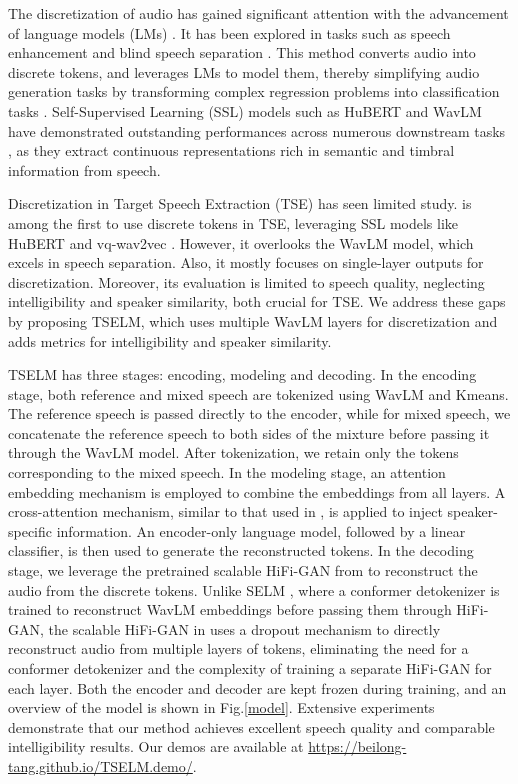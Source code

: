 \documentclass[conference]{IEEEtran}
\begin{document}
The discretization of audio has gained significant attention with the advancement of language models (LMs) \cite{l1, l2, l3, l4, l5}. It has been explored in
tasks such as speech enhancement \cite{selm} and blind speech separation \cite{dasb,tokensplit}.
This method converts audio into discrete tokens, and leverages LMs to model them, thereby simplifying audio generation tasks by transforming complex regression problems into classification tasks \cite{dasb}. Self-Supervised Learning (SSL) models such as HuBERT \cite{hubert} and WavLM \cite{wavlm} have demonstrated outstanding performances across numerous downstream tasks \cite{superb}, as they extract continuous representations rich in semantic and timbral information from speech.

Discretization in Target Speech Extraction (TSE) has seen limited study. \cite{gen_tse} is among the first to use discrete tokens in TSE, leveraging SSL models like HuBERT and vq-wav2vec \cite{vq_wav2vec}. However, it overlooks the WavLM model, which excels in speech separation. Also, it mostly focuses on single-layer outputs for discretization. Moreover, its evaluation is limited to speech quality, neglecting intelligibility and speaker similarity, both crucial for TSE. We address these gaps by proposing TSELM, which uses multiple WavLM layers for discretization and adds metrics for intelligibility and speaker similarity.

TSELM has three stages: encoding, modeling and decoding. In the encoding stage, both reference and mixed speech are tokenized using WavLM and Kmeans. The reference speech is passed directly to the encoder, while for mixed speech, we concatenate the reference speech to both sides of the mixture before passing it through the WavLM model. After tokenization, we retain only the tokens corresponding to the mixed speech.
In the modeling stage, an attention embedding mechanism is employed to combine the embeddings from all layers. A cross-attention mechanism, similar to that used in \cite{usef_tes}, is applied to inject speaker-specific information. An encoder-only language model, followed by a linear classifier, is then used to generate the reconstructed tokens.
In the decoding stage, we leverage the pretrained scalable HiFi-GAN from \cite{unit_hifi} to reconstruct the audio from the discrete tokens. Unlike SELM \cite{selm}, where a conformer detokenizer is trained to reconstruct WavLM embeddings before passing them through HiFi-GAN, the scalable HiFi-GAN in \cite{unit_hifi} uses a dropout mechanism to directly reconstruct audio from multiple layers of tokens, eliminating the need for a conformer detokenizer and the complexity of training a separate HiFi-GAN for each layer. Both the encoder and decoder are kept frozen during training, and an overview of the model is shown in Fig.\ref{model}.
Extensive experiments demonstrate that our method achieves excellent speech quality and comparable intelligibility results. Our demos are available at \href{https://beilong-tang.github.io/TSELM.demo/}{https://beilong-tang.github.io/TSELM.demo/}.
\end{document}
